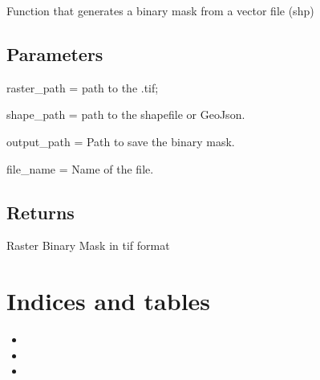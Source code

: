 \documentclass[letterpaper,10pt]{sphinxmanual}
\begin{document}
\begin{fulllineitems}
\label{\detokenize{generated/akhdefo_functions.binary_mask:akhdefo_functions.binary_mask}}
\pysigstartsignatures
{}
\pysigstopsignatures
\sphinxAtStartPar
Function that generates a binary mask from a vector file (shp)


\section{Parameters}
\label{\detokenize{generated/akhdefo_functions.binary_mask:parameters}}
\sphinxAtStartPar
raster\_path = path to the .tif;

\sphinxAtStartPar
shape\_path = path to the shapefile or GeoJson.

\sphinxAtStartPar
output\_path = Path to save the binary mask.

\sphinxAtStartPar
file\_name = Name of the file.


\section{Returns}
\label{\detokenize{generated/akhdefo_functions.binary_mask:returns}}
\sphinxAtStartPar
Raster Binary Mask in tif format

\end{fulllineitems}



\chapter{Indices and tables}
\label{\detokenize{index:indices-and-tables}}\begin{itemize}
\item {} 
\sphinxAtStartPar
{}

\item {} 
\sphinxAtStartPar
{}

\item {} 
\sphinxAtStartPar
{}

\end{itemize}



\renewcommand{\indexname}{Index}
\end{document}
